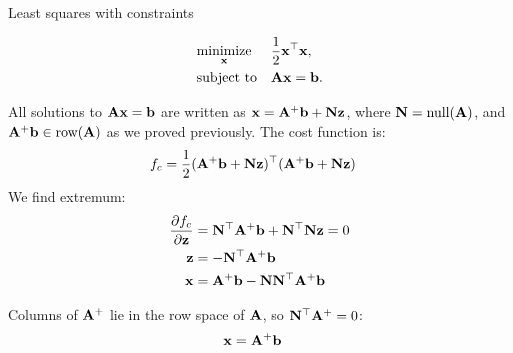 \documentclass{beamer}
\begin{document}
\myqrframe




\begin{frame}{Least squares with constraints}
	\begin{flushleft}
		
		\begin{small}
		\begin{equation}
			\begin{aligned}
				& \underset{\mathbf{x}}{\text{minimize}}
				& & \frac{1}{2} \mathbf{x}^\top \mathbf{x}, \\
				& \text{subject to}
				& & \mathbf{A} \mathbf{x} = \mathbf{b}.
			\end{aligned}
		\end{equation}
		
		All solutions to $\mathbf{A} \mathbf{x} = \mathbf{b}$ are written as $\mathbf{x} = \mathbf{A}^+\mathbf{b} + \mathbf{N}\mathbf{z}$, where $\mathbf{N} = \text{null}(\mathbf{A})$, and $\mathbf{A}^+\mathbf{b} \in \text{row}(\mathbf{A})$ as we proved previously.  The cost function is:
		\begin{align}
			f_c &= \frac{1}{2} (\mathbf{A}^+\mathbf{b} + \mathbf{N}\mathbf{z})^\top (\mathbf{A}^+\mathbf{b} + \mathbf{N}\mathbf{z}) 
		\end{align}
		We find extremum:
		\begin{align}
			\frac{\partial f_c}{\partial \mathbf{z}} &= \mathbf{N}^\top \mathbf{A}^+\mathbf{b} + \mathbf{N}^\top\mathbf{N}\mathbf{z} = 0
			\\
			\mathbf{z} &= - \mathbf{N}^\top \mathbf{A}^+\mathbf{b} 
			\\
			\mathbf{x} &= \mathbf{A}^+\mathbf{b} -  \mathbf{N}\mathbf{N}^\top \mathbf{A}^+\mathbf{b} 
		\end{align}
		
		Columns of $\mathbf{A}^+$ lie in the row space of $\mathbf{A}$, so $\mathbf{N}^\top \mathbf{A}^+ = 0$:
		\begin{align}
			\mathbf{x} &= \mathbf{A}^+\mathbf{b}
		\end{align}
	\end{small}
		
	\end{flushleft}
\end{frame}
\end{document}
